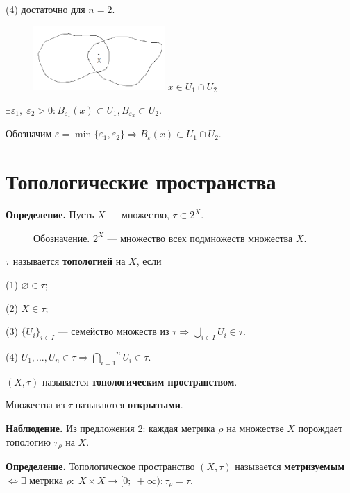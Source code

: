 \documentclass[12pt,a4paper]{article}
\begin{document}
(4) достаточно для $n = 2.$
	
\begin{figure}
	\includegraphics[width = 5cm]{lect2_3.png}
	$x \in U_1 \cap U_2$
\end{figure}
	
$\exists \varepsilon_1, \; \varepsilon_2 > 0\!\!: B_{\varepsilon_1}(x) \subset U_1, B_{\varepsilon_2} \subset U_2.$
	
Обозначим $\varepsilon = \min\{\varepsilon_1, \varepsilon_2\} \Rightarrow B_{\varepsilon}(x) \subset  U_1 \cap U_2.$
	
\section{Топологические пространства}
	
\textbf{Определение.} Пусть $X$ --- множество, $\tau \subset 2^{X}.$
	
\begin{figure}
	Обозначение. $2^{X}$ --- множество всех подмножеств множества $X.$
\end{figure}

$\tau$ называется \textbf{топологией} на $X$, если
	
(1) $\varnothing \in \tau;$
	
(2) $X \in \tau;$
	
(3) $\{U_i\}_{i \in I}$ --- семейство множеств из $\tau \Rightarrow \underset{i \in I}{\bigcup} U_i \in \tau.$
	
(4) $U_1, ..., U_n \in \tau \Rightarrow \overset{n}{\underset{i = 1}{\bigcap}} U_i \in \tau.$
	
$\left(X, \tau \right)$ называется \textbf{топологическим пространством}.
	
Множества из $\tau$ называются \textbf{открытыми}.
	
\textbf{Наблюдение.} Из предложения 2: каждая метрика $\rho$ на множестве $X$ порождает топологию $\tau_{\rho}$ на $X.$
	
\textbf{Определение.} Топологическое пространство $(X, \tau)$ называется \textbf{метризуемым} $\Leftrightarrow \exists$ метрика $\rho\!\!: \; X\times X \to [0;\; +\infty)\!\!: \tau_{\rho} = \tau.$
	
\end{document}
